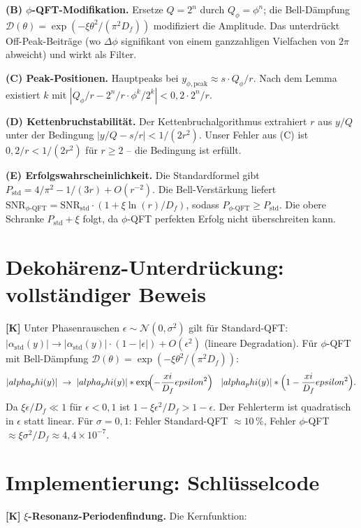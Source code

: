\textbf{(B) $\phi$-QFT-Modifikation.} Ersetze $Q=2^n$ durch $Q_\phi=\phi^n$;
die Bell-Dämpfung $\mathcal D(\theta)=\exp(-\xi\theta^2/(\pi^2D_f))$ modifiziert
die Amplitude. Das unterdrückt Off-Peak-Beiträge (wo $\Delta\phi$ signifikant
von einem ganzzahligen Vielfachen von $2\pi$ abweicht) und wirkt als Filter.

\textbf{(C) Peak-Positionen.} Hauptpeaks bei
$y_{\phi,\text{peak}}\approx s\cdot Q_\phi/r$. Nach dem Lemma existiert $k$ mit
$|Q_\phi/r - 2^n/r\cdot\phi^k/2^k|<0{,}2\cdot2^n/r$.

\textbf{(D) Kettenbruchstabilität.} Der Kettenbruchalgorithmus extrahiert $r$
aus $y/Q$ unter der Bedingung $|y/Q-s/r|<1/(2r^2)$. Unser Fehler aus (C) ist
$0{,}2/r<1/(2r^2)$ für $r\ge2$ -- die Bedingung ist erfüllt.

\textbf{(E) Erfolgswahrscheinlichkeit.} Die Standardformel gibt
$P_\text{std}=4/\pi^2-1/(3r)+O(r^{-2})$. Die Bell-Verstärkung liefert
$\text{SNR}_{\phi\text{-QFT}} = \text{SNR}_\text{std}\cdot(1+\xi\ln(r)/D_f)$,
sodass $P_{\phi\text{-QFT}}\ge P_\text{std}$. Die obere Schranke
$P_\text{std}+\xi$ folgt, da $\phi$-QFT perfekten Erfolg nicht überschreiten kann.

\section{Dekohärenz-Unterdrückung: vollständiger Beweis}

\textbf{[K]} Unter Phasenrauschen $\epsilon\sim\mathcal N(0,\sigma^2)$ gilt für
Standard-QFT: $|\alpha_\text{std}(y)|\to|\alpha_\text{std}(y)|\cdot(1-|\epsilon|)+O(\epsilon^2)$
(lineare Degradation). Für $\phi$-QFT mit Bell-Dämpfung
$\mathcal D(\theta)=\exp(-\xi\theta^2/(\pi^2D_f))$:
\[
  |\alpha_\phi(y)|\;\to\;|\alpha_\phi(y)|\cdot
  \exp\!\Bigl(-\frac\xi{D_f}\epsilon^2\Bigr)
  \;\approx\;|\alpha_\phi(y)|\cdot\Bigl(1-\frac\xi{D_f}\epsilon^2\Bigr).
\]
Da $\xi\epsilon/D_f\ll1$ für $\epsilon<0{,}1$ ist $1-\xi\epsilon^2/D_f>1-\epsilon$.
Der Fehlerterm ist quadratisch in $\epsilon$ statt linear. Für $\sigma=0{,}1$:
Fehler Standard-QFT $\approx10\,\%$, Fehler $\phi$-QFT
$\approx\xi\sigma^2/D_f\approx4{,}4\times10^{-7}$.

\section{Implementierung: Schlüsselcode}

\textbf{[K]} \textbf{$\xi$-Resonanz-Periodenfindung.} Die Kernfunktion:

